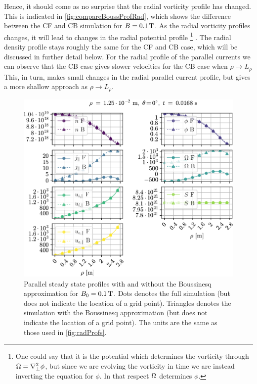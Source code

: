 Hence, it should come as no surprise that the radial vorticity profile has changed.
This is indicated in \cref{fig:compareBoussProfRad}, which shows the difference between the CF and CB simulation for $B=0.1\, \text{T}$.
As the radial vorticity profiles changes, it will lead to changes in the radial potential profile%
%
\footnote{One could say that it is the potential which determines the vorticity through $\Omega = \nabla_\perp^2 \phi$, but since we are evolving the vorticity in time we are instead inverting the equation for $\phi$.
In that respect $\Omega$ determines $\phi$.}%
%
.
The radial density profile stays roughly the same for the CF and CB case, which will be discussed in further detail below.
For the radial profile of the parallel currents we can observe that the CB case gives slower velocities for the CB case when $\rho \to L_\rho$
This, in turn, makes small changes in the radial parallel current profile, but gives a more shallow approach as $\rho\to L_\rho$.
%
\begin{figure}[h]
    \centering
    \includegraphics{fig/results/compareBouss/1DProfPar001B}
    \caption{Parallel steady state profiles with and without the Boussinesq approximation for $B_0=0.1\, \text{T}$.
        Dots denotes the full simulation (but does not indicate the location of a grid point).
        Triangles denotes the simulation with the Boussinesq approximation (but does not indicate the location of a grid point).
        The units are the same as those used in \cref{fig:radProfs}.
    }
    \label{fig:compareBoussProfPar}
\end{figure}
%

